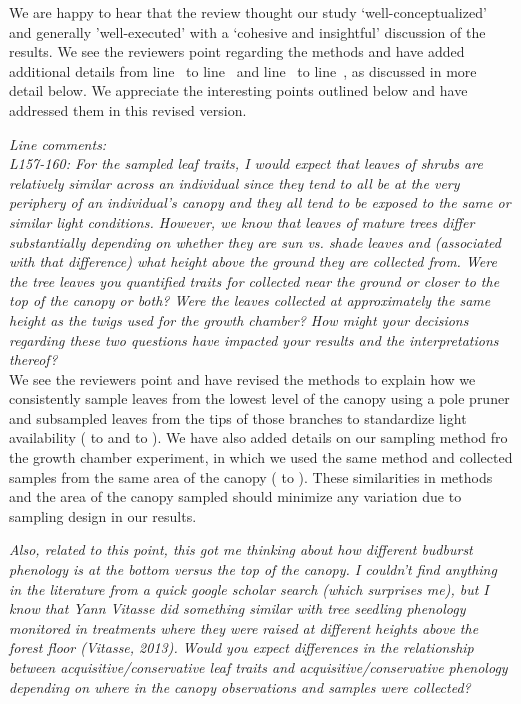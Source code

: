 \documentclass[11pt,a4paper]{article}
\newcommand{\lr}[1]{line~\lineref{#1}}
\begin{document}
We are happy to hear that the review thought our study `well-conceptualized' and generally 'well-executed' with a `cohesive and insightful' discussion of the results. We see the reviewers point regarding the methods and have added additional details from \lr{X} to \lr{Y} and \lr{X} to \lr{Y}, as discussed in more detail below. We appreciate the interesting points outlined below and have addressed them in this revised version. 

\emph{Line comments:}\\

\emph{L157-160: For the sampled leaf traits, I would expect that leaves of shrubs are relatively similar across an individual since they tend to all be at the very periphery of an individual’s canopy and they all tend to be exposed to the same or similar light conditions. However, we know that leaves of mature trees differ substantially depending on whether they are sun vs. shade leaves and (associated with that difference) what height above the ground they are collected from. Were the tree leaves you quantified traits for collected near the ground or closer to the top of the canopy or both? Were the leaves collected at approximately the same height as the twigs used for the growth chamber? How might your decisions regarding these two questions have impacted your results and the interpretations thereof?}\\

We see the reviewers point and have revised the methods to explain how we consistently sample leaves from the lowest level of the canopy using a pole pruner and subsampled leaves from the tips of those branches to standardize light availability ( to  and  to ). We have also added details on our sampling method fro the growth chamber experiment, in which we used the same method and collected samples from the same area of the canopy ( to ). These similarities in methods and the area of the canopy sampled should minimize any variation due to sampling design in our results. 

\emph{Also, related to this point, this got me thinking about how different budburst phenology is at the bottom versus the top of the canopy. I couldn’t find anything in the literature from a quick google scholar search (which surprises me), but I know that Yann Vitasse did something similar with tree seedling phenology monitored in treatments where they were raised at different heights above the forest floor (Vitasse, 2013). Would you expect differences in the relationship between acquisitive/conservative leaf traits and acquisitive/conservative phenology depending on where in the canopy observations and samples were collected?}\\
\end{document}
